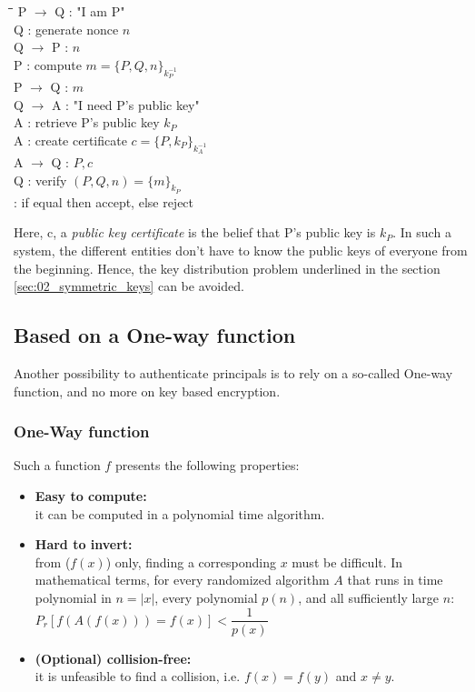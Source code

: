 \begin{tabbing}
	\hspace{4em}\=\hspace{4em}\=\hspace{2em}\=\kill
	\>  P $\rightarrow$ Q\>  : \> "I am P" \\
	\>  Q  \>  : \> generate nonce $n$	\\
	\>  Q $\rightarrow$ P \>  : \> $n$ \\
	\>  P  \>  : \> compute $m = \lbrace P, Q, n \rbrace_{k_{P}^{-1}}$ 				\\
	\>  P $\rightarrow$ Q \>  : \> $m$ \\
	\>  Q $\rightarrow$ A \>  : \> "I need P's public key" \\
	\>  A \>  : \> retrieve P's public key $k_{P}$ \\
	\>  A \>  : \> create certificate $c = \lbrace P, k_{P} \rbrace_{k_{A}^{-1}} $ \\
	\>  A $\rightarrow$ Q \>  : \> $P,c$ \\
	\>  Q \>  : \> verify $(P,Q,n) = \lbrace m \rbrace_{k_{P}}$ \\
	\>    \>  : \> if equal then accept, else reject \\
\end{tabbing} 

Here, c, a \emph{public key certificate} is the belief that P's public key is $k_{P}$. In such a system, the different entities don't have to know the public keys of everyone from the beginning. Hence, the key distribution problem underlined in the section \ref{sec:02_symmetric_keys} can be avoided.

\subsection{Based on a One-way function}
Another possibility to authenticate principals is to rely on a so-called One-way function, and no more on key based encryption.

\subsubsection{One-Way function}
Such a function $f$ presents the following properties:
\begin{itemize}
	\item \textbf{Easy to compute:} \\
	it can be computed in a polynomial time algorithm.
	\item \textbf{Hard to invert:} \\
	from ($f(x)$) only, finding a corresponding $x$ must be difficult. In mathematical terms,  for every randomized algorithm $A$ that runs in time polynomial in $n=|x|$, every polynomial $p(n)$, and all sufficiently large $n$: \\
	$ P_{r}[f(A(f(x))) = f(x)] < \dfrac{1}{p(x)}$ 
	\item \textbf{(Optional) collision-free:} \\
	it is unfeasible to find a collision, i.e. $f(x) = f(y)$ and $x \ne y$.
\end{itemize}

